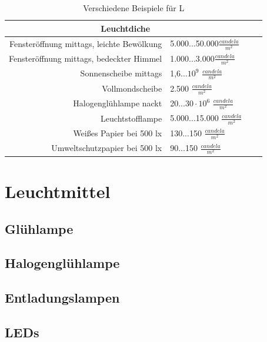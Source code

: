 \begin{table}[htp] 
		\centering
		\begin{tabular}{rlcc}  %
		\toprule
		\multicolumn{2}{c}{\large\sffamily Leuchtdiche}\\ 							
		\midrule
		Fensteröffnung mittags, leichte Bewölkung & 5.000...50.000$\frac{candela}{m^{2}}$\\
		Fensteröffnung mittags, bedeckter Himmel & 1.000...3.000$\frac{candela}{m^{2}}$\\
		Sonnenscheibe mittags & 1,6...$10^{9}$ $\frac{candela}{m^{2}}$\\
		Vollmondscheibe & 2.500 $\frac{candela}{m^{2}}$\\
		Halogenglühlampe nackt & 20...$30 \cdot 10^{6}$ $\frac{candela}{m^{2}}$\\
		Leuchtstofflampe & 5.000...15.000 $\frac{candela}{m^{2}}$\\
		Weißes Papier bei 500 lx & 130...150 $\frac{candela}{m^{2}}$\\
		Umweltschutzpapier bei 500 lx & 90...150 $\frac{candela}{m^{2}}$\\
		\bottomrule
		\end{tabular}
		\caption{Verschiedene Beispiele für L\protect\footnotemark}	
		\label{t_candelamm}
	\end{table}


\chapter{Leuchtmittel}

\section{Glühlampe} \label{sec_glühlampe}

\section{Halogenglühlampe} \label{sec_halogenglühlampe}

\section{Entladungslampen} \label{sec_entladungslampe}

\section{LEDs} \label{sec_led}

